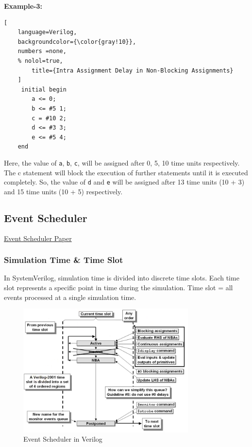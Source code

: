 \documentclass[12pt, a4paper]{article}
\begin{document}
\textbf{Example-3:}

\begin{lstlisting}[
    language=Verilog,
    backgroundcolor={\color{gray!10}},
    numbers =none,
    % nolol=true,
        title={Intra Assignment Delay in Non-Blocking Assignments}
    ]  
     initial begin  
        a <= 0;       
        b <= #5 1;   
        c = #10 2;   
        d <= #3 3;
        e <= #5 4;    
    end                
\end{lstlisting}

Here, the value of  \texttt{a}, \texttt{b}, \texttt{c}, will be assigned after 0, 5, 10 time units respectively. The c statement will block the execution of further statements until it is executed completely. So, the value of \texttt{d} and \texttt{e} will be assigned after 13 time units (10 + 3) and 15 time units (10 + 5) respectively.

\subsection{Event Scheduler}

\href{http://www.sunburst-design.com/papers/CummingsSNUG2006Boston_SystemVerilog_Events.pdf}{Event Scheduler Paper}

\subsubsection{Simulation Time \& Time Slot}

In SystemVerilog, simulation time is divided into discrete time slots. Each time slot represents a specific point in time during the simulation. 
Time slot = all events processed at a single simulation time.

\begin{figure}[H]
    \centering
    \includegraphics[width=0.8\textwidth]{Verilog_Event_Scheduler.png}
    \caption{Event Scheduler in Verilog}
    \label{fig:event_scheduler}
\end{figure}
\end{document}
